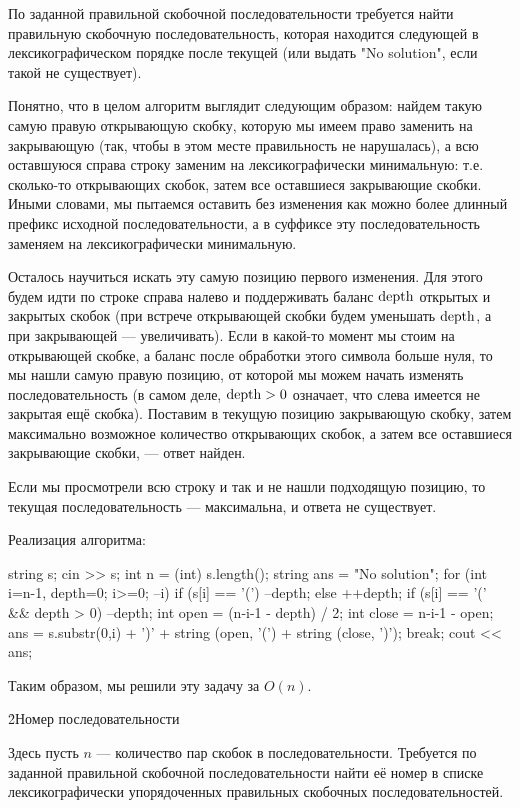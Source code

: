 По заданной правильной скобочной последовательности требуется найти правильную скобочную последовательность, которая находится следующей в лексикографическом порядке после текущей (или выдать "No solution", если такой не существует).

Понятно, что в целом алгоритм выглядит следующим образом: найдем такую самую правую открывающую скобку, которую мы имеем право заменить на закрывающую (так, чтобы в этом месте правильность не нарушалась), а всю оставшуюся справа строку заменим на лексикографически минимальную: т.е. сколько-то открывающих скобок, затем все оставшиеся закрывающие скобки. Иными словами, мы пытаемся оставить без изменения как можно более длинный префикс исходной последовательности, а в суффиксе эту последовательность заменяем на лексикографически минимальную.

Осталось научиться искать эту самую позицию первого изменения. Для этого будем идти по строке справа налево и поддерживать баланс $\rm depth$ открытых и закрытых скобок (при встрече открывающей скобки будем уменьшать $\rm depth$, а при закрывающей --- увеличивать). Если в какой-то момент мы стоим на открывающей скобке, а баланс после обработки этого символа больше нуля, то мы нашли самую правую позицию, от которой мы можем начать изменять последовательность (в самом деле, $\rm depth > 0$ означает, что слева имеется не закрытая ещё скобка). Поставим в текущую позицию закрывающую скобку, затем максимально возможное количество открывающих скобок, а затем все оставшиеся закрывающие скобки, --- ответ найден.

Если мы просмотрели всю строку и так и не нашли подходящую позицию, то текущая последовательность --- максимальна, и ответа не существует.

Реализация алгоритма:

\code
string s;
cin >> s;
int n = (int) s.length();
string ans = "No solution";
for (int i=n-1, depth=0; i>=0; --i) {
	if (s[i] == '(')
		--depth;
	else
		++depth;
	if (s[i] == '(' && depth > 0) {
		--depth;
		int open = (n-i-1 - depth) / 2;
		int close = n-i-1 - open;
		ans = s.substr(0,i) + ')' + string (open, '(') + string (close, ')');
		break;
	}
}
cout << ans;
\endcode

Таким образом, мы решили эту задачу за $O(n)$.


\h2{Номер последовательности}

Здесь пусть $n$ --- количество пар скобок в последовательности. Требуется по заданной правильной скобочной последовательности найти её номер в списке лексикографически упорядоченных правильных скобочных последовательностей.

